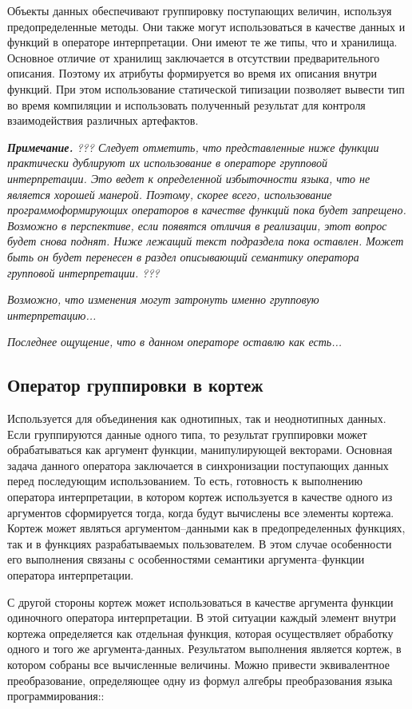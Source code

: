 Объекты данных обеспечивают группировку поступающих величин, используя предопределенные методы. Они также могут использоваться в качестве данных и функций в операторе интерпретации. Они имеют те же типы, что и хранилища. Основное отличие от хранилищ заключается в отсутствии предварительного описания. Поэтому их атрибуты формируется во время их описания внутри функций. При этом использование статической типизации позволяет вывести тип во время компиляции и использовать полученный результат для контроля взаимодействия различных артефактов.

\textit{\textbf{Примечание.}
??? Следует отметить, что представленные ниже функции практически дублируют их использование в операторе групповой интерпретации. Это ведет к определенной избыточности языка, что не является хорошей манерой. Поэтому, скорее всего, использование программоформирующих операторов в качестве функций пока будет запрещено. Возможно в перспективе, если появятся отличия в реализации, этот вопрос будет снова поднят. Ниже лежащий текст подраздела пока оставлен. Может быть он будет перенесен в раздел описывающий семантику оператора групповой интерпретации. ???}

\textit{Возможно, что изменения могут затронуть именно групповую интерпретацию...}

\textit{Последнее ощущение, что в данном операторе оставлю как есть...}

\subsection{Оператор группировки в кортеж}

Используется для объединения как однотипных, так и неоднотипных данных. Если группируются данные одного типа, то результат группировки может обрабатываться как аргумент функции, манипулирующей векторами. Основная задача данного оператора заключается в синхронизации поступающих данных перед последующим использованием. То есть, готовность к выполнению оператора интерпретации, в котором кортеж используется в качестве одного из аргументов сформируется тогда, когда будут вычислены все элементы кортежа. Кортеж может являться аргументом--данными как в предопределенных функциях, так и в функциях разрабатываемых пользователем. В этом случае особенности его выполнения связаны с особенностями  семантики аргумента--функции оператора интерпретации.

С другой стороны кортеж может использоваться в качестве аргумента функции одиночного оператора интерпретации. В этой ситуации каждый элемент внутри кортежа определяется как отдельная функция, которая осуществляет обработку одного и того же аргумента-данных. Результатом выполнения является кортеж, в котором собраны все вычисленные величины. Можно привести эквивалентное преобразование, определяющее одну из формул алгебры преобразования языка программирования::


